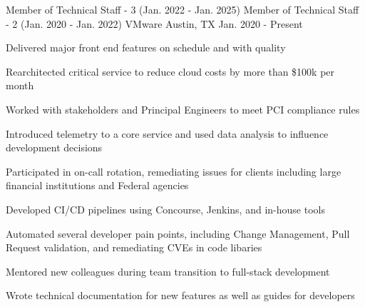 \begin{cventryroles}
  \cventryroles
    {Member of Technical Staff - 3 (Jan. 2022 - Jan. 2025)}
    {Member of Technical Staff - 2 (Jan. 2020 - Jan. 2022)}
    {VMware} %
    {Austin, TX} %
    {Jan. 2020 - Present}
    {
      \begin{cvitems} %
        \item {Delivered major front end features on schedule and with quality}
        \item {Rearchitected critical service to reduce cloud costs by more than \$100k per month}
        \item {Worked with stakeholders and Principal Engineers to meet PCI compliance rules}
        \item {Introduced telemetry to a core service and used data analysis to influence development decisions}
        \item {Participated in on-call rotation, remediating issues for clients including large financial institutions and Federal agencies}
        \item {Developed CI/CD pipelines using Concourse, Jenkins, and in-house tools}
        \item {Automated several developer pain points, including Change Management, Pull Request validation, and remediating CVEs in code libaries}
        \item {Mentored new colleagues during team transition to full-stack development}
        \item {Wrote technical documentation for new features as well as guides for developers}
      \end{cvitems}
    }
\end{cventryroles}
